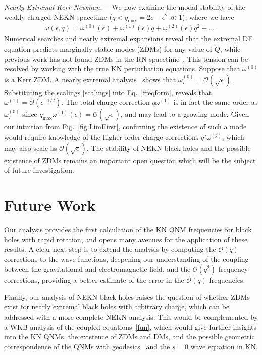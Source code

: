 \begin{refsection}
{\it Nearly Extremal Kerr-Newman.---} We now examine the modal stability of the weakly charged NEKN spacetime ($q < q_\text{max} =  2\epsilon -\epsilon^2 \ll 1$), where we have 
\begin{align}
\omega(\epsilon, q)=\omega^{(0)}(\epsilon)+\omega^{(1)}(\epsilon) q+ \omega^{(2)}(\epsilon) q^2+ \dots \,. \label{rapqexp}
\end{align}
Numerical searches and nearly extremal expansions \cite{ZimmermanDF} reveal that the extremal DF equation predicts marginally stable modes (ZDMs) for any value of $Q$, while previous work has not found ZDMs in the RN spacetime~\cite{Onozawa:1995vu, Andersson1996}. 
This tension can be resolved by working with the true KN perturbation equations. Suppose that $\omega^{(0)}$ is a Kerr ZDM. A nearly extremal analysis~\cite{Yang2012b} shows that $\omega_I^{(0)}=\mathcal{O}(\sqrt \epsilon)$. 
Substituting the scalings \eqref{scalings} into Eq.~\eqref{freqform}, reveals that $\omega^{(1)}=\mathcal{O}(\epsilon^{-1/2})$. The total charge correction $q \omega^{(1)}$ is in fact the same order as $\omega_I^{(0)}$ since $q_\text{max}\omega^{(1)}(\epsilon) =\mathcal{O}(\sqrt \epsilon)$, and may lead to a growing mode. 
Given our intuition from Fig.~\ref{fig:LimFirst}, confirming the existence of such a mode would require knowledge of the higher order charge corrections $q^j \omega^{(j)}$, which may also scale as $\mathcal{O}(\sqrt \epsilon)$. The stability of NEKN black holes and the possible existence of ZDMs remains an important open question which will be the subject of future investigation.
 
\section{Future Work}
Our analysis provides the first calculation of the KN QNM frequencies for black holes with rapid rotation, and opens many avenues for the application of these results. A clear next step is to extend the analysis by computing the $\mathcal{O}(q)$ corrections to the wave functions, deepening our understanding of the coupling between the gravitational and electromagnetic field, and the $\mathcal{O}(q^2)$ frequency corrections, providing a better estimate of the error in the $\mathcal{O}(q)$ frequencies.

Finally, our analysis of NEKN black holes raises the question of whether ZDMs exist for nearly extremal black holes with arbitrary charge, which can be addressed with a more complete NEKN analysis. 
This would be complemented by a WKB analysis of the coupled equations~\eqref{fun}, which would give further insights into the KN QNMs, the existence of ZDMs and DMs, and the possible geometric correspondence of the QNMs with geodesics~\cite{Mashhoon1985,Yang2012a} and the $s=0$ wave equation in KN.


\end{refsection}
